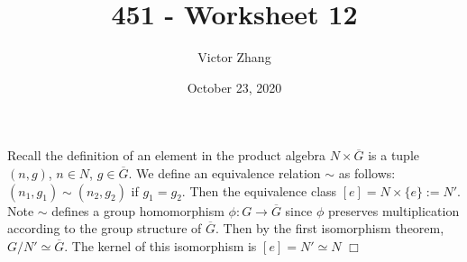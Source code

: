 \documentclass{article}
\title{451 - Worksheet 12}
\author{Victor Zhang}
\date{October 23, 2020}
\begin{document}
\maketitle

\section{}
Recall the definition of an element in the product algebra $N \times \overline{G}$ is a tuple $(n,g)$, $n \in N$, $g \in \overline{G}$. We define an equivalence relation $\sim$ as follows: $(n_1,g_1) \sim (n_2,g_2)$ if $g_1 = g_2$. Then the equivalence class $[e] = N \times \{e\} := N'$. Note $\sim$ defines a group homomorphism $\phi: G \rightarrow \overline{G}$ since $\phi$ preserves multiplication according to the group structure of $\overline{G}$. Then by the first isomorphism theorem, $G/N{'} \simeq \overline{G}$. The kernel of this isomorphism is $[e] = N' \simeq N$ $\Box$
\end{document}
